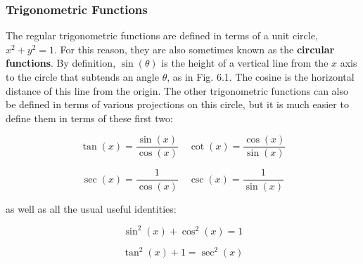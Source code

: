 \documentclass[11pt,titlepage]{article}
\numberwithin{equation}{subsection}
\begin{document}
\subsubsection{Trigonometric Functions}
\begin{tcolorbox}
\centering
{}
\end{tcolorbox}

The regular trigonometric functions are defined in terms of a unit circle, $x^{2}+y^{2}=1$. For this reason, they are also sometimes known as the \textbf{circular functions}. By definition, $\sin(\theta)$ is the height of a vertical line from the $x$ axis to the circle that subtends an angle $\theta$, as in Fig. 6.1. The cosine is the horizontal distance of this line from the origin. The other trigonometric functions can also be defined in terms of various projections on this circle, but it is much easier to define them in terms of these first two:

\begin{equation}
\tan(x)=\frac{\sin(x)}{\cos(x)} \quad \cot(x)=\frac{\cos(x)}{\sin(x)}
\end{equation}

\begin{equation}
\sec(x)=\frac{1}{\cos(x)} \quad \csc(x)=\frac{1}{\sin(x)}
\end{equation}

as well as all the usual useful identities:

\begin{equation}
\sin^{2}(x)+\cos^{2}(x)=1
\end{equation}

\begin{equation}
\tan^{2}(x)+1=\sec^{2}(x)
\end{equation}
\end{document}
